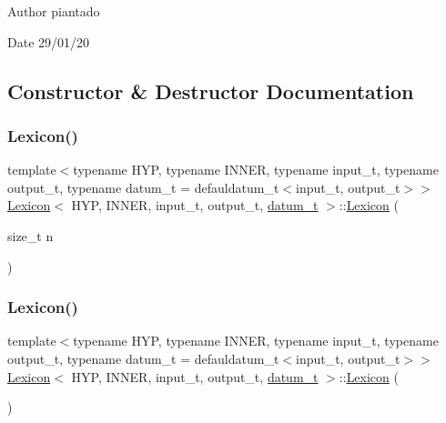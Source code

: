\begin{DoxyAuthor}{Author}
piantado 
\end{DoxyAuthor}
\begin{DoxyDate}{Date}
29/01/20 
\end{DoxyDate}


\subsection{Constructor \& Destructor Documentation}
\mbox{\label{class_lexicon_a06bafc4711d145a026fe03e9e1168ae8}} 
\subsubsection{\texorpdfstring{Lexicon()}{Lexicon()}\hspace{0.1cm}{\footnotesize\ttfamily [1/2]}}
{\footnotesize\ttfamily template$<$typename H\+YP, typename I\+N\+N\+ER, typename input\+\_\+t, typename output\+\_\+t, typename datum\+\_\+t = defauldatum\+\_\+t$<$input\+\_\+t, output\+\_\+t$>$$>$ \\
\hyperlink{class_lexicon}{Lexicon}$<$ H\+YP, I\+N\+N\+ER, input\+\_\+t, output\+\_\+t, \hyperlink{class_bayesable_a9f1a6c0cd7855550fa10b1a8f13a5867}{datum\+\_\+t} $>$\+::\hyperlink{class_lexicon}{Lexicon} (\begin{DoxyParamCaption}\item[{size\+\_\+t}]{n }\end{DoxyParamCaption})\hspace{0.3cm}{\ttfamily [inline]}}

\mbox{\label{class_lexicon_ab027c90715b8616af424c6682cdfef0f}} 
\subsubsection{\texorpdfstring{Lexicon()}{Lexicon()}\hspace{0.1cm}{\footnotesize\ttfamily [2/2]}}
{\footnotesize\ttfamily template$<$typename H\+YP, typename I\+N\+N\+ER, typename input\+\_\+t, typename output\+\_\+t, typename datum\+\_\+t = defauldatum\+\_\+t$<$input\+\_\+t, output\+\_\+t$>$$>$ \\
\hyperlink{class_lexicon}{Lexicon}$<$ H\+YP, I\+N\+N\+ER, input\+\_\+t, output\+\_\+t, \hyperlink{class_bayesable_a9f1a6c0cd7855550fa10b1a8f13a5867}{datum\+\_\+t} $>$\+::\hyperlink{class_lexicon}{Lexicon} (\begin{DoxyParamCaption}{ }\end{DoxyParamCaption})\hspace{0.3cm}{\ttfamily [inline]}}



